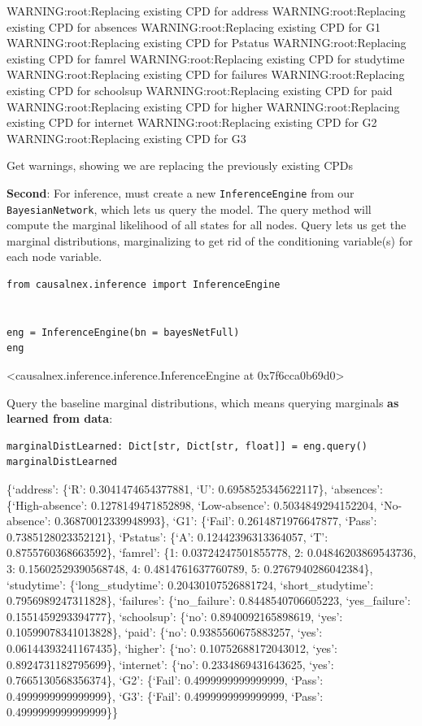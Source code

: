 \documentclass[
]{article}
\begin{document}
WARNING:root:Replacing existing CPD for address WARNING:root:Replacing
existing CPD for absences WARNING:root:Replacing existing CPD for G1
WARNING:root:Replacing existing CPD for Pstatus WARNING:root:Replacing
existing CPD for famrel WARNING:root:Replacing existing CPD for
studytime WARNING:root:Replacing existing CPD for failures
WARNING:root:Replacing existing CPD for schoolsup WARNING:root:Replacing
existing CPD for paid WARNING:root:Replacing existing CPD for higher
WARNING:root:Replacing existing CPD for internet WARNING:root:Replacing
existing CPD for G2 WARNING:root:Replacing existing CPD for G3

Get warnings, showing we are replacing the previously existing CPDs

\textbf{Second}: For inference, must create a new
\texttt{InferenceEngine} from our
\texttt{BayesianNetwork}, which lets us query the model.
The query method will compute the marginal likelihood of all states for
all nodes. Query lets us get the marginal distributions, marginalizing
to get rid of the conditioning variable(s) for each node variable.

\begin{verbatim}
from causalnex.inference import InferenceEngine


eng = InferenceEngine(bn = bayesNetFull)
eng
\end{verbatim}

\textless causalnex.inference.inference.InferenceEngine at
0x7f6cca0b69d0\textgreater{}

Query the baseline marginal distributions, which means querying
marginals \textbf{as learned from data}:

\begin{verbatim}
marginalDistLearned: Dict[str, Dict[str, float]] = eng.query()
marginalDistLearned
\end{verbatim}

\{`address': \{`R': 0.3041474654377881, `U': 0.6958525345622117\},
`absences': \{`High-absence': 0.1278149471852898, `Low-absence':
0.5034849294152204, `No-absence': 0.36870012339948993\}, `G1': \{`Fail':
0.2614871976647877, `Pass': 0.7385128023352121\}, `Pstatus': \{`A':
0.12442396313364057, `T': 0.8755760368663592\}, `famrel': \{1:
0.03724247501855778, 2: 0.04846203869543736, 3: 0.15602529390568748, 4:
0.4814761637760789, 5: 0.2767940286042384\}, `studytime':
\{`long\_studytime': 0.20430107526881724, `short\_studytime':
0.7956989247311828\}, `failures': \{`no\_failure': 0.8448540706605223,
`yes\_failure': 0.1551459293394777\}, `schoolsup': \{`no':
0.8940092165898619, `yes': 0.10599078341013828\}, `paid': \{`no':
0.9385560675883257, `yes': 0.06144393241167435\}, `higher': \{`no':
0.10752688172043012, `yes': 0.8924731182795699\}, `internet': \{`no':
0.2334869431643625, `yes': 0.7665130568356374\}, `G2': \{`Fail':
0.4999999999999999, `Pass': 0.4999999999999999\}, `G3': \{`Fail':
0.4999999999999999, `Pass': 0.4999999999999999\}\}
\end{document}
